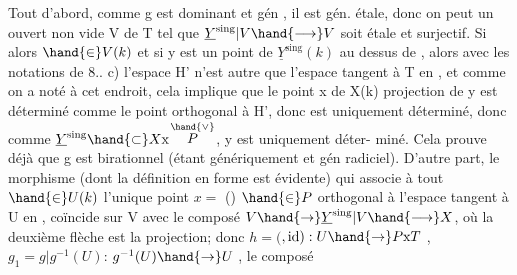 Tout d'abord, comme g est dominant et gén  , il est
gén. étale, donc on peut  un ouvert non vide V de T tel que
$\underline{Y}^{\text{sing}}|V \hand{\longrightarrow} V$ soit étale et surjectif. Si alors \hand{$\xi$}$\hand{\in} V(k)$ et si y est
un point de $\underline{Y}^{\text{sing}}(k)$ au dessus de \hand{$\xi$}, alors avec les notations de
8.. c)  l'espace H' n'est autre que l'espace tangent à T en \hand{$\xi$},
et comme on a noté à cet endroit, cela implique que le point x de X(k)
projection de y est déterminé comme le point orthogonal à H', donc est
uniquement déterminé, donc comme $\underline{Y}^{\text{sing}}\hand{\subset} X\text{x}$$\overset{\hand{\vee}}{P}$, y est uniquement déter-%
miné. Cela prouve déjà que g est birationnel (étant  
génériquement   et gén radiciel). 
D'autre part, le morphisme \hand{$\unsure{\mu|\psi}$}(dont la définition en forme est évidente)
qui associe à tout $\hand{\in} U(k)$ l'unique point $x=$ \hand{$\mu$}(\hand{$\xi$}) $\hand{\in} P$ orthogonal à
l'espace tangent à U en \hand{$\xi$}, coïncide sur V avec le composé
$V\hand{\rightarrow} \underline{Y}^{\text{sing}}|V \hand{\longrightarrow} X$, où la deuxième flèche est la projection; donc
  $h=($\hand{$\mu$}$,\mathrm{id}) : U\hand{\rightarrow} P\text{x}T$ , 
 $g_1 = g|g^{-1}(U)$\xout{=}: $g^{-1}(U)\hand{\rightarrow} U$ , le composé

